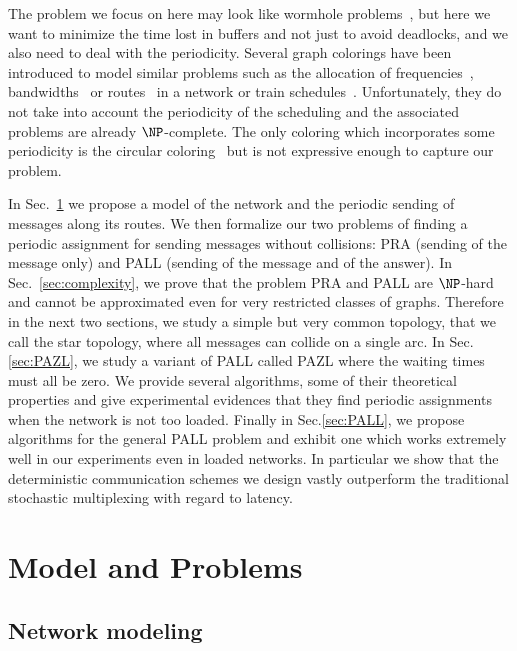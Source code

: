 \documentclass[a4paper,10pt]{article}
\begin{document}
The problem we focus on here may look like wormhole problems~\cite{cole1996benefit}, but here we want to minimize the time lost in buffers and not just to avoid deadlocks, and we also need to deal with the periodicity. Several graph colorings have been introduced to model similar problems such as the allocation of frequencies~\cite{borndorfer1998frequency}, bandwidths~\cite{erlebach2001complexity} or routes~\cite{cole1996benefit} in a network or train schedules~\cite{strotmann2007railway}. Unfortunately, they do not take into account the periodicity of the scheduling and the associated problems are already $\NP$-complete. The only coloring which incorporates some periodicity is the circular coloring~\cite{zhou2013multiple, zhu2001circular,zhu2006recent} but is not expressive enough to capture our problem.

 In Sec.~\ref{sec:def} we propose a model of the network and the periodic sending of messages along its routes. 
 We then formalize our two problems of finding a periodic assignment for sending messages without collisions: PRA (sending of the message only) and PALL (sending of the message and of the answer).  
In Sec.~\ref{sec:complexity}, we prove that the problem PRA and PALL are $\NP$-hard and cannot be approximated even for very
restricted classes of graphs. 
Therefore in the next two sections, we study a simple but very common topology, that we call the
star topology, where all messages can collide on a single arc.
In Sec.\ref{sec:PAZL}, we study a variant of PALL called PAZL  where the waiting times must all be zero. We provide several algorithms, some of their theoretical properties and give experimental evidences that they find periodic assignments when the network is not too loaded. Finally in Sec.\ref{sec:PALL}, we propose algorithms for the general PALL problem and exhibit one which works extremely well in our experiments even in loaded networks. In particular we show that the deterministic communication schemes we design vastly outperform the traditional stochastic multiplexing with regard to latency. 


\section{Model and Problems}\label{sec:def}

  \subsection{Network modeling}
  
\end{document}
